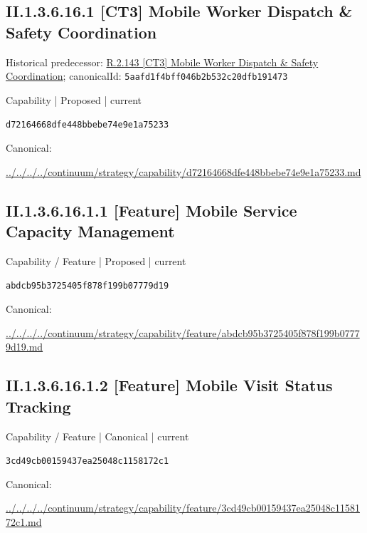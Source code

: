 \documentclass[10pt,a4paper]{article}
\begin{document}
\subsection*{II.1.3.6.16.1 [CT3] Mobile Worker Dispatch \& Safety Coordination}
Historical predecessor: \hyperref[element-5aafd1f4bff046b2b532c20dfb191473]{R.2.143 [CT3] Mobile Worker Dispatch \& Safety Coordination}; canonicalId: \texttt{5aafd1f4bff046b2b532c20dfb191473}\par
\label{element-d72164668dfe448bbebe74e9e1a75233}
{\small Capability | Proposed | current}\par
\texttt{d72164668dfe448bbebe74e9e1a75233}\par
Canonical: \par
{\footnotesize\url{../../../../continuum/strategy/capability/d72164668dfe448bbebe74e9e1a75233.md}}\par
\subsection*{II.1.3.6.16.1.1 [Feature] Mobile Service Capacity Management}
\label{element-abdcb95b3725405f878f199b07779d19}
{\small Capability / Feature | Proposed | current}\par
\texttt{abdcb95b3725405f878f199b07779d19}\par
Canonical: \par
{\footnotesize\url{../../../../continuum/strategy/capability/feature/abdcb95b3725405f878f199b07779d19.md}}\par
\subsection*{II.1.3.6.16.1.2 [Feature] Mobile Visit Status Tracking}
\label{element-3cd49cb00159437ea25048c1158172c1}
{\small Capability / Feature | Canonical | current}\par
\texttt{3cd49cb00159437ea25048c1158172c1}\par
Canonical: \par
{\footnotesize\url{../../../../continuum/strategy/capability/feature/3cd49cb00159437ea25048c1158172c1.md}}\par
\end{document}
